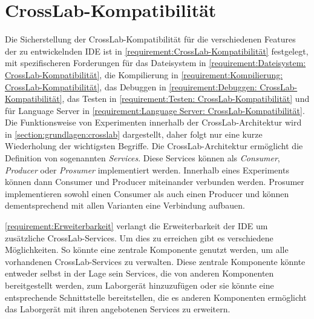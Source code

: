 \section{CrossLab-Kompatibilität}\label{section:konzeption:crosslab-kompatibilität}

Die Sicherstellung der CrossLab-Kompatibilität für die verschiedenen Features der zu entwickelnden IDE ist in \autoref{requirement:CrossLab-Kompatibilität} festgelegt, mit spezifischeren Forderungen für das Dateisystem in \autoref{requirement:Dateisystem: CrossLab-Kompatibilität}, die Kompilierung in \autoref{requirement:Kompilierung: CrossLab-Kompatibilität}, das Debuggen in \autoref{requirement:Debuggen: CrossLab-Kompatibilität}, das Testen in \autoref{requirement:Testen: CrossLab-Kompatibilität} und für Language Server in \autoref{requirement:Language Server: CrossLab-Kompatibilität}. Die Funktionsweise von Experimenten innerhalb der CrossLab-Architektur wird in \autoref{section:grundlagen:crosslab} dargestellt, daher folgt nur eine kurze Wiederholung der wichtigsten Begriffe. Die CrossLab-Architektur ermöglicht die Definition von sogenannten \emph{Services}. Diese Services können als \emph{Consumer}, \emph{Producer} oder \emph{Prosumer} implementiert werden. Innerhalb eines Experiments können dann Consumer und Producer miteinander verbunden werden. Prosumer implementieren sowohl einen Consumer als auch einen Producer und können dementsprechend mit allen Varianten eine Verbindung aufbauen.

\autoref{requirement:Erweiterbarkeit} verlangt die Erweiterbarkeit der IDE um zusätzliche CrossLab-Services. Um dies zu erreichen gibt es verschiedene Möglichkeiten. So könnte eine zentrale Komponente genutzt werden, um alle vorhandenen CrossLab-Services zu verwalten. Diese zentrale Komponente könnte entweder selbst in der Lage sein Services, die von anderen Komponenten bereitgestellt werden, zum Laborgerät hinzuzufügen oder sie könnte eine entsprechende Schnittstelle bereitstellen, die es anderen Komponenten ermöglicht das Laborgerät mit ihren angebotenen Services zu erweitern.

